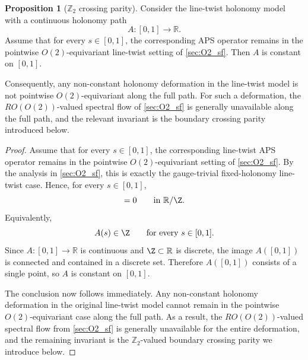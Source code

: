 \documentclass[11pt]{article}
\newcommand{\R}{\mathbb{R}}
\theoremstyle{definition}
\newtheorem{proposition}[theorem]{Proposition}
\numberwithin{equation}{section}
\begin{document}
\begin{proposition}[\texorpdfstring{$\mathbb Z_2$}{Z2} crossing parity]
\label{prop:line_twist_bridge}
Consider the line-twist holonomy model with a continuous holonomy path
\begin{equation}\label{eq:continuous_holonomy_path_section8}
A:[0,1]\to\R.
\end{equation}
Assume that for every \(s\in[0,1]\), the corresponding APS operator remains in the
pointwise \(O(2)\)-equivariant line-twist setting of \autoref{sec:O2_sf}. Then \(A\) is
constant on \([0,1]\).

Consequently, any non-constant holonomy deformation in the line-twist model is not pointwise \(O(2)\)-equivariant along the full path. For such a deformation, the \(RO(O(2))\)-valued spectral flow of \autoref{sec:O2_sf} is generally unavailable along the full path, and the relevant invariant is the boundary crossing parity introduced below.
\end{proposition}

\begin{proof}
Assume that for every \(s\in[0,1]\), the corresponding line-twist APS operator remains in the
pointwise \(O(2)\)-equivariant setting of \autoref{sec:O2_sf}. By the analysis in
\autoref{sec:O2_sf}, this is exactly the gauge-trivial fixed-holonomy line-twist case. Hence,
for every \(s\in[0,1]\),
\begin{equation}
[A(s)]=0
\qquad\text{in }\R/\Z.
\end{equation}
Equivalently,
\begin{equation}
A(s)\in\Z
\qquad\text{for every }s\in[0,1].
\end{equation}
Since \(A:[0,1]\to\R\) is continuous and \(\Z\subset\R\) is discrete, the image \(A([0,1])\)
is connected and contained in a discrete set. Therefore \(A([0,1])\) consists of a single
point, so \(A\) is constant on \([0,1]\).

The conclusion now follows immediately. Any non-constant holonomy deformation in the original
line-twist model cannot remain in the pointwise \(O(2)\)-equivariant case along the full path.
As a result, the \(RO(O(2))\)-valued spectral flow from \autoref{sec:O2_sf} is generally
unavailable for the entire deformation, and the remaining invariant is the
\(\mathbb Z_2\)-valued boundary crossing parity we introduce below.
\end{proof}
\end{document}
